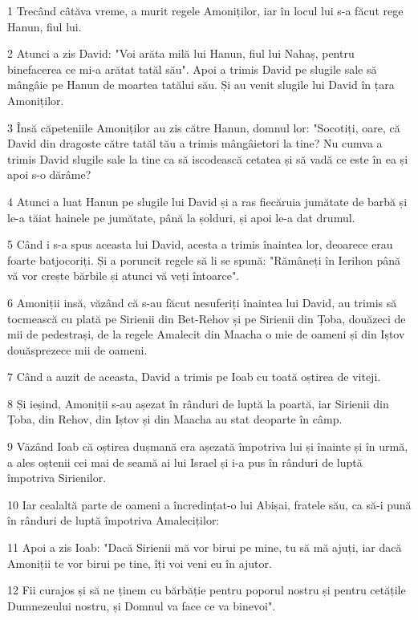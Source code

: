 \par 1 Trecând câtăva vreme, a murit regele Amoniților, iar în locul lui s-a făcut rege Hanun, fiul lui.
\par 2 Atunci a zis David: "Voi arăta milă lui Hanun, fiul lui Nahaș, pentru binefacerea ce mi-a arătat tatăl său". Apoi a trimis David pe slugile sale să mângâie pe Hanun de moartea tatălui său. Și au venit slugile lui David în țara Amoniților.
\par 3 Însă căpeteniile Amoniților au zis către Hanun, domnul lor: "Socotiți, oare, că David din dragoste către tatăl tău a trimis mângâietori la tine? Nu cumva a trimis David slugile sale la tine ca să iscodească cetatea și să vadă ce este în ea și apoi s-o dărâme?
\par 4 Atunci a luat Hanun pe slugile lui David și a ras fiecăruia jumătate de barbă și le-a tăiat hainele pe jumătate, până la șolduri, și apoi le-a dat drumul.
\par 5 Când i s-a spus aceasta lui David, acesta a trimis înaintea lor, deoarece erau foarte batjocoriți. Și a poruncit regele să li se spună: "Rămâneți în Ierihon până vă vor crește bărbile și atunci vă veți întoarce".
\par 6 Amoniții insă, văzând că s-au făcut nesuferiți înaintea lui David, au trimis să tocmească cu plată pe Sirienii din Bet-Rehov și pe Sirienii din Țoba, douăzeci de mii de pedestrași, de la regele Amalecit din Maacha o mie de oameni și din Iștov douăsprezece mii de oameni.
\par 7 Când a auzit de aceasta, David a trimis pe Ioab cu toată oștirea de viteji.
\par 8 Și ieșind, Amoniții s-au așezat în rânduri de luptă la poartă, iar Sirienii din Țoba, din Rehov, din Iștov și din Maacha au stat deoparte în câmp.
\par 9 Văzând Ioab că oștirea dușmană era așezată împotriva lui și înainte și în urmă, a ales oștenii cei mai de seamă ai lui Israel și i-a pus în rânduri de luptă împotriva Sirienilor.
\par 10 Iar cealaltă parte de oameni a încredințat-o lui Abișai, fratele său, ca să-i pună în rânduri de luptă împotriva Amaleciților:
\par 11 Apoi a zis Ioab: "Dacă Sirienii mă vor birui pe mine, tu să mă ajuți, iar dacă Amoniții te vor birui pe tine, îți voi veni eu în ajutor.
\par 12 Fii curajos și să ne ținem cu bărbăție pentru poporul nostru și pentru cetățile Dumnezeului nostru, și Domnul va face ce va binevoi".

